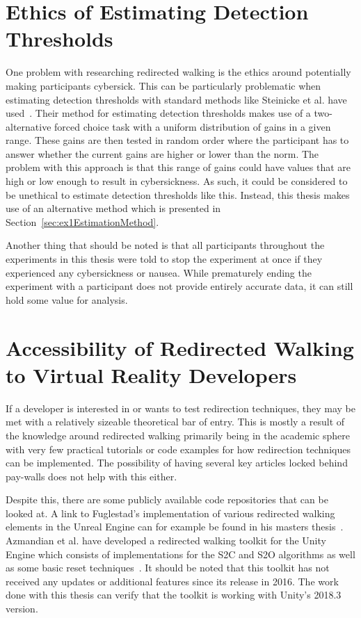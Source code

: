 \section{Ethics of Estimating Detection Thresholds}\label{sec:ethics}
One problem with researching redirected walking is the ethics around potentially making participants cybersick. This can be particularly problematic when estimating detection thresholds with standard methods like Steinicke et al. have used~\cite{5072212}. Their method for estimating detection thresholds makes use of a two-alternative forced choice task with a uniform distribution of gains in a given range. These gains are then tested in random order where the participant has to answer whether the current gains are higher or lower than the norm. The problem with this approach is that this range of gains could have values that are high or low enough to result in cybersickness. As such, it could be considered to be unethical to estimate detection thresholds like this. Instead, this thesis makes use of an alternative method which is presented in Section~\ref{sec:ex1EstimationMethod}.

Another thing that should be noted is that all participants throughout the experiments in this thesis were told to stop the experiment at once if they experienced any cybersickness or nausea. While prematurely ending the experiment with a participant does not provide entirely accurate data, it can still hold some value for analysis. 
   
\section{Accessibility of Redirected Walking to Virtual Reality Developers}
If a developer is interested in or wants to test redirection techniques, they may be met with a relatively sizeable theoretical bar of entry. This is mostly a result of the knowledge around redirected walking primarily being in the academic sphere with very few practical tutorials or code examples for how redirection techniques can be implemented. The possibility of having several key articles locked behind pay-walls does not help with this either. 

Despite this, there are some publicly available code repositories that can be looked at. A link to Fuglestad's implementation of various redirected walking elements in the Unreal Engine can for example be found in his masters thesis~\cite{fuglestad2018redirected}. Azmandian et al. have developed a redirected walking toolkit for the Unity Engine which consists of implementations for the S2C and S2O algorithms as well as some basic reset techniques~\cite{azmandian2016redirected}. It should be noted that this toolkit has not received any updates or additional features since its release in 2016. The work done with this thesis can verify that the toolkit is working with Unity's 2018.3 version.

